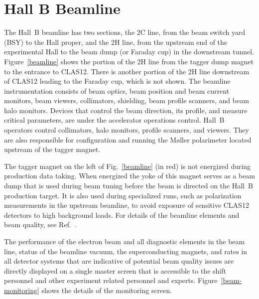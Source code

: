 \documentclass[final,3p,twocolumn]{elsarticle}
\begin{document}
\section{Hall B Beamline} 

The Hall~B beamline has two sections, the 2C line, from the beam switch yard (BSY) to the Hall proper, and the 2H
line, from the upstream end of the experimental Hall to the beam dump (or Faraday cup) in the downstream tunnel.
Figure~\ref{beamline} shows the portion of the 2H line from the tagger dump magnet to the entrance to CLAS12. There 
is another portion of the 2H line downstream of CLAS12 leading to the Faraday cup, which is not shown. The beamline instrumentation
consists of beam optics, beam position and beam current monitors, beam viewers, collimators,  shielding, beam
profile scanners, and beam halo monitors. Devices that control the beam direction, its profile, and  measure critical
parameters, are under the accelerator operations control. Hall~B operators control collimators, halo monitors,
profile scanners, and viewers. They are also responsible for configuration and running the M{\o}ller polarimeter
located upstream of the tagger magnet.

The tagger magnet on the left of Fig.~\ref{beamline} (in red) is not energized during production data taking. When energized the
yoke of this magnet serves as a beam dump that is used during beam tuning before the beam is directed on the
Hall~B production target. It is also used during specialized runs, such as polarization measurements in the upstream
beamline, to avoid exposure of sensitive CLAS12 detectors to high background loads. For details of the beamline
elements and beam quality, see Ref.~\cite{beamline}.  

The performance of the electron beam and all diagnostic elements in the beam line, status of the beamline vacuum, 
the superconducting magnets, and rates in all detector systems that are indicative of potential beam quality issues 
are directly displayed on a single master screen that is accessible to the shift personnel and other experiment related 
personnel and experts. Figure~\ref{beam-monitoring} shows the details of the monitoring screen.     
\end{document}
